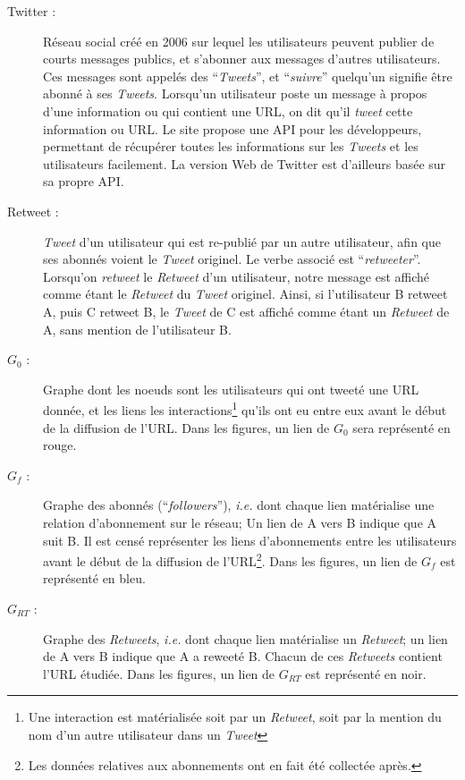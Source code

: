 \documentclass[]{article}
\begin{document}
\begin{description}
\item[Twitter :]
Réseau social créé en 2006 sur lequel les utilisateurs peuvent publier
de courts messages publics, et s'abonner aux messages d'autres
utilisateurs. Ces messages sont appelés des ``\emph{Tweets}'', et
``\emph{suivre}'' quelqu'un signifie être abonné à ses \emph{Tweets}.
Lorsqu'un utilisateur poste un message à propos d'une information ou qui
contient une URL, on dit qu'il \emph{tweet} cette information ou URL. Le
site propose une API pour les développeurs, permettant de récupérer
toutes les informations sur les \emph{Tweets} et les utilisateurs
facilement. La version Web de Twitter est d'ailleurs basée sur sa propre
API.

\item[Retweet :]
\emph{Tweet} d'un utilisateur qui est re-publié par un autre
utilisateur, afin que ses abonnés voient le \emph{Tweet} originel. Le
verbe associé est ``\emph{retweeter}''. Lorsqu'on \emph{retweet} le
\emph{Retweet} d'un utilisateur, notre message est affiché comme étant
le \emph{Retweet} du \emph{Tweet} originel. Ainsi, si l'utilisateur B
retweet A, puis C retweet B, le \emph{Tweet} de C est affiché comme
étant un \emph{Retweet} de A, sans mention de l'utilisateur B.

\item[$G_{0}$ :]
Graphe dont les noeuds sont les utilisateurs qui ont tweeté une URL
donnée, et les liens les interactions\footnote{Une interaction est
 matérialisée soit par un \emph{Retweet}, soit par la mention du nom
 d'un autre utilisateur dans un \emph{Tweet}} qu'ils ont eu entre eux
avant le début de la diffusion de l'URL. Dans les figures, un lien de
$G_{0}$ sera représenté en rouge.

\item[$G_{f}$ :]
Graphe des abonnés (``\emph{followers}''), \emph{i.e.} dont chaque lien
matérialise une relation d'abonnement sur le réseau; Un lien de A vers B
indique que A suit B. Il est censé représenter les liens d'abonnements
entre les utilisateurs avant le début de la diffusion de l'URL\footnote{Les
 données relatives aux abonnements ont en fait été collectée après.}.
Dans les figures, un lien de $G_{f}$ est représenté en bleu.

\item[$G_{RT}$ :]
Graphe des \emph{Retweets}, \emph{i.e.} dont chaque lien matérialise un
\emph{Retweet}; un lien de A vers B indique que A a reweeté B. Chacun de
ces \emph{Retweets} contient l'URL étudiée. Dans les figures, un lien de
$G_{RT}$ est représenté en noir.

\end{description}
\end{document}

